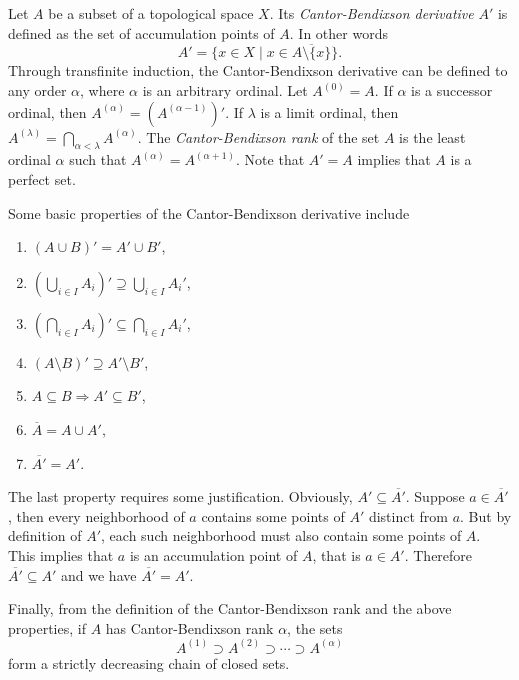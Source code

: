 \documentclass[12pt]{article}
\def\sse{\subseteq}
\def\spse{\supseteq}
\def\impl{\Rightarrow}
\begin{document}
%
Let $A$ be a subset of a topological space $X$. Its \emph{Cantor-Bendixson
derivative} $A'$ is defined as the set of accumulation points of $A$. In
other words
\[
  A' = \{ x\in X \mid x\in \overline{A\setminus \{x\}} \}.
\]
Through transfinite induction, the Cantor-Bendixson derivative can be
defined to any order $\alpha$, where $\alpha$ is an arbitrary ordinal.
Let $A^{(0)} = A$.  If $\alpha$ is a successor ordinal, then
$A^{(\alpha)} = \left(A^{(\alpha-1)}\right)'$. If $\lambda$ is a limit
ordinal, then $A^{(\lambda)} = \bigcap_{\alpha<\lambda} A^{(\alpha)}$.
The \emph{Cantor-Bendixson rank} of the set $A$ is the least ordinal
$\alpha$ such that $A^{(\alpha)} = A^{(\alpha+1)}$. Note that $A' = A$
implies that $A$ is a perfect set.

Some basic properties of the Cantor-Bendixson derivative include
\begin{enumerate}
\item $(A\cup B)' = A'\cup B'$,
\item $(\bigcup_{i\in I} A_i)' \spse \bigcup_{i\in I} A_i'$,
\item $(\bigcap_{i\in I} A_i)' \sse \bigcap_{i\in I} A_i'$,
\item $(A\setminus B)' \spse A' \setminus B'$,
\item $A\sse B \impl A' \sse B'$,
\item $\overline{A} = A \cup A'$,
\item $\overline{A'} = A'$.
\end{enumerate}
The last property requires some justification. Obviously, $A'\sse
\overline{A'}$. Suppose $a\in \overline{A'}$, then every neighborhood of
$a$ contains some points of $A'$ distinct from $a$. But by definition of
$A'$, each such neighborhood must also contain some points of $A$. This
implies that $a$ is an accumulation point of $A$, that is $a\in A'$.
Therefore $\overline{A'}\sse A'$ and we have $\overline{A'}=A'$.

Finally, from the definition of the Cantor-Bendixson rank and the above
properties, if $A$ has Cantor-Bendixson rank $\alpha$, the sets
\[
  A^{(1)} \supset A^{(2)} \supset \cdots \supset A^{(\alpha)}
\]
form a strictly decreasing chain of closed sets.
\end{document}
